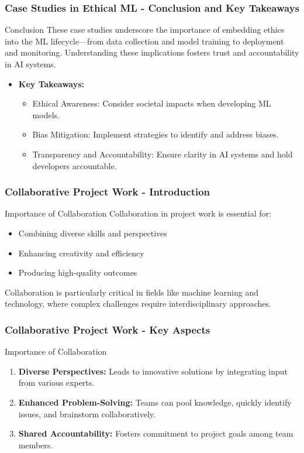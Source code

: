 \documentclass[aspectratio=169]{beamer}
\begin{document}
\begin{frame}[fragile]
    \frametitle{Case Studies in Ethical ML - Conclusion and Key Takeaways}
    \begin{block}{Conclusion}
        These case studies underscore the importance of embedding ethics into the 
        ML lifecycle—from data collection and model training to deployment and monitoring. 
        Understanding these implications fosters trust and accountability in AI systems.
    \end{block}
    \begin{itemize}
        \item \textbf{Key Takeaways:}
        \begin{itemize}
            \item Ethical Awareness: Consider societal impacts when developing ML models.
            \item Bias Mitigation: Implement strategies to identify and address biases.
            \item Transparency and Accountability: Ensure clarity in AI systems and 
            hold developers accountable.
        \end{itemize}
    \end{itemize}
\end{frame}

\begin{frame}[fragile]
    \frametitle{Collaborative Project Work - Introduction}
    \begin{block}{Importance of Collaboration}
        Collaboration in project work is essential for:
        \begin{itemize}
            \item Combining diverse skills and perspectives
            \item Enhancing creativity and efficiency
            \item Producing high-quality outcomes
        \end{itemize}
    \end{block}
    Collaboration is particularly critical in fields like machine learning and technology, where complex challenges require interdisciplinary approaches.
\end{frame}

\begin{frame}[fragile]
    \frametitle{Collaborative Project Work - Key Aspects}
    \begin{block}{Importance of Collaboration}
        \begin{enumerate}
            \item \textbf{Diverse Perspectives:} Leads to innovative solutions by integrating input from various experts.
            \item \textbf{Enhanced Problem-Solving:} Teams can pool knowledge, quickly identify issues, and brainstorm collaboratively.
            \item \textbf{Shared Accountability:} Fosters commitment to project goals among team members.
        \end{enumerate}
    \end{block}
\end{frame}
\end{document}
